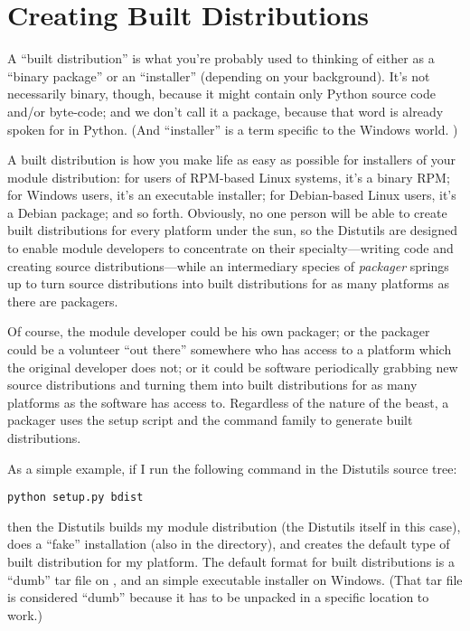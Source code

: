 \documentclass{howto}
\begin{document}
\section{Creating Built Distributions}
\label{built-dist}

A ``built distribution'' is what you're probably used to thinking of
either as a ``binary package'' or an ``installer'' (depending on your
background).  It's not necessarily binary, though, because it might
contain only Python source code and/or byte-code; and we don't call it a
package, because that word is already spoken for in Python.  (And
``installer'' is a term specific to the Windows world.  )

A built distribution is how you make life as easy as possible for
installers of your module distribution: for users of RPM-based Linux
systems, it's a binary RPM; for Windows users, it's an executable
installer; for Debian-based Linux users, it's a Debian package; and so
forth.  Obviously, no one person will be able to create built
distributions for every platform under the sun, so the Distutils are
designed to enable module developers to concentrate on their
specialty---writing code and creating source distributions---while an
intermediary species of \emph{packager} springs up to turn source
distributions into built distributions for as many platforms as there
are packagers.

Of course, the module developer could be his own packager; or the
packager could be a volunteer ``out there'' somewhere who has access to
a platform which the original developer does not; or it could be
software periodically grabbing new source distributions and turning them
into built distributions for as many platforms as the software has
access to.  Regardless of the nature of the beast, a packager uses the
setup script and the  command family to generate built
distributions.

As a simple example, if I run the following command in the Distutils
source tree:
\begin{verbatim}
python setup.py bdist
\end{verbatim}
then the Distutils builds my module distribution (the Distutils itself
in this case), does a ``fake'' installation (also in the 
directory), and creates the default type of built distribution for my
platform.  The default format for built distributions is a ``dumb'' tar
file on \UNIX, and an simple executable installer on Windows.  (That tar
file is considered ``dumb'' because it has to be unpacked in a specific
location to work.)
\end{document}
